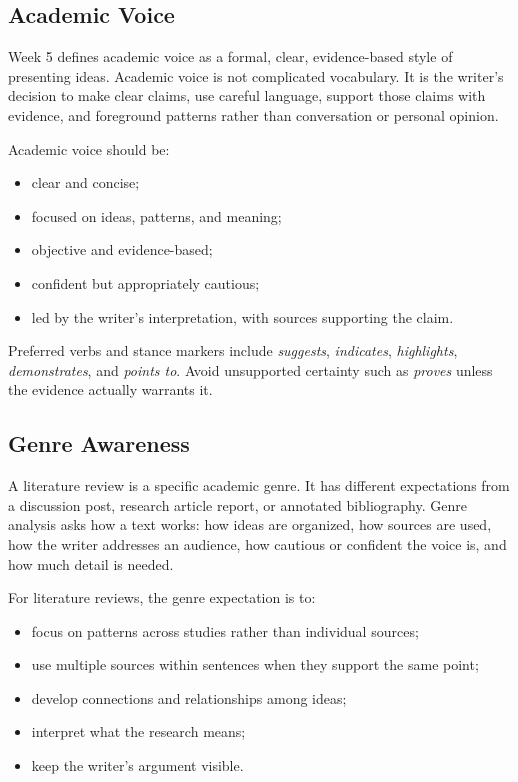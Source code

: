 \documentclass[10pt,letterpaper]{article}
\begin{document}
\subsection{Academic Voice}

Week 5 defines academic voice as a formal, clear, evidence-based style of presenting ideas. Academic voice is not complicated vocabulary. It is the writer's decision to make clear claims, use careful language, support those claims with evidence, and foreground patterns rather than conversation or personal opinion.

Academic voice should be:

\begin{itemize}
\item clear and concise;
\item focused on ideas, patterns, and meaning;
\item objective and evidence-based;
\item confident but appropriately cautious;
\item led by the writer's interpretation, with sources supporting the claim.
\end{itemize}

Preferred verbs and stance markers include \emph{suggests}, \emph{indicates}, \emph{highlights}, \emph{demonstrates}, and \emph{points to}. Avoid unsupported certainty such as \emph{proves} unless the evidence actually warrants it.

\subsection{Genre Awareness}

A literature review is a specific academic genre. It has different expectations from a discussion post, research article report, or annotated bibliography. Genre analysis asks how a text works: how ideas are organized, how sources are used, how the writer addresses an audience, how cautious or confident the voice is, and how much detail is needed.

For literature reviews, the genre expectation is to:

\begin{itemize}
\item focus on patterns across studies rather than individual sources;
\item use multiple sources within sentences when they support the same point;
\item develop connections and relationships among ideas;
\item interpret what the research means;
\item keep the writer's argument visible.
\end{itemize}
\end{document}
